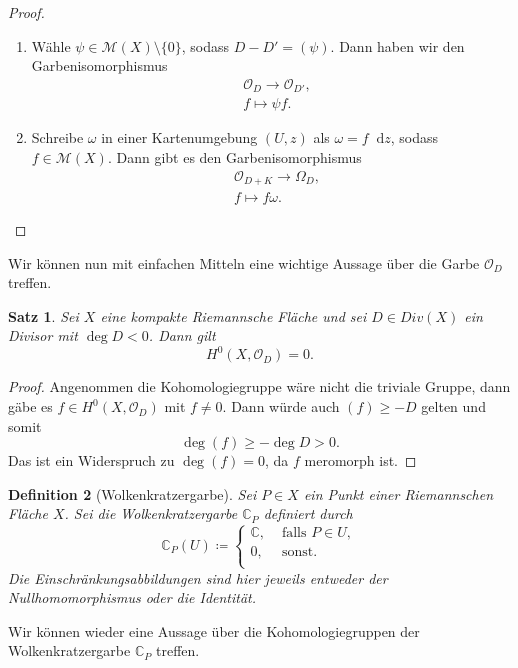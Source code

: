 \documentclass[11pt,a4paper,toc=bibliography]{scrartcl}
\theoremstyle{def}
\newtheorem{defi}{Definition}[section]
\theoremstyle{thm}
\newtheorem{satz}[defi]{Satz}
\theoremstyle{remark}
\newcommand*\dif{\mathop{}\!\mathrm{d}}\newcommand{\einschraenkung}{\,\rule[-5pt]{0.4pt}{12pt}\,{}} %
\begin{document}
\begin{proof}
	\begin{enumerate}
		\item Wähle $\psi \in \mathcal{M}(X)\setminus \{0\}$, sodass $D-D'=(\psi)$. Dann haben wir den Garbenisomorphismus
		\begin{align*}
			&\mathcal{O}_D\rightarrow \mathcal{O}_{D'},\\
			&f\mapsto \psi f.
		\end{align*}
		\item Schreibe $\omega $ in einer Kartenumgebung $(U,z)$ als $\omega = f\dif z$, sodass $f\in \mathcal{M}(X)$. Dann gibt es den Garbenisomorphismus 
		\begin{align*}
			&\mathcal{O}_{D+K}\rightarrow \Omega_D,\\
			&f\mapsto f\omega.
		\end{align*}
	\end{enumerate}
\end{proof}
Wir können nun mit einfachen Mitteln eine wichtige Aussage über die Garbe $\mathcal{O}_D$ treffen.
\begin{satz}
	Sei $X$ eine kompakte Riemannsche Fläche und sei $D\in Div(X)$ ein Divisor mit $\deg D<0$. Dann gilt
	\[ H^0(X,\mathcal{O}_D)=0.
	\]
\end{satz}
\begin{proof}
	Angenommen die Kohomologiegruppe wäre nicht die triviale Gruppe, dann gäbe es $f\in H^0(X,\mathcal{O}_D)$ mit $f\neq 0$. Dann würde auch $(f)\geq -D$ gelten und somit
	\[
	\deg (f)\geq -\deg D>0.
	\]
	Das ist ein Widerspruch zu $\deg (f)=0$, da $f$ meromorph ist.
\end{proof}
\begin{defi}[Wolkenkratzergarbe]                       
    Sei $P\in X$ ein Punkt einer Riemannschen Fläche $X$. Sei die Wolkenkratzergarbe $\mathbb{C}_P$ definiert durch
    \[
    \mathbb{C}_P(U)\coloneqq \begin{cases}
                           \mathbb{C},&\text{ falls } P\in U,\\
                           0,& \text{ sonst}.\\
                        \end{cases}
    \]
	Die Einschränkungsabbildungen sind hier jeweils entweder der Nullhomomorphismus oder die Identität.
\end{defi}
Wir können wieder eine Aussage über die Kohomologiegruppen der Wolkenkratzergarbe $\mathbb{C}_P$ treffen.
\end{document}
